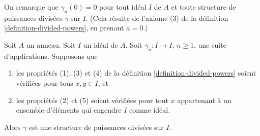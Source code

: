 \noindent
On remarque que $\gamma_n\left(0\right) = 0$ pour tout idéal $I$ de
$A$ et toute structure de puissances divisées $\gamma$ sur $I$. (Cela résulte
de l'axiome (3) de la définition \ref{definition-divided-powers},
en prenant $a=0$.)

\begin{lemma}
\label{lemma-check-on-generators}
Soit $A$ un anneau. Soit $I$ un idéal de $A$. Soit $\gamma_n : I \to I$,
$n \geq 1$, une suite d'applications. Supposons que
\begin{enumerate}
\item[(a)] les propriétés (1), (3) et (4) de la définition
\ref{definition-divided-powers} soient vérifiées pour tous $x, y \in I$, et
\item[(b)] les propriétés (2) et (5) soient vérifiées pour tout $x$ appartenant
à un ensemble d'éléments qui engendre $I$ comme idéal.
\end{enumerate}
Alors $\gamma$ est une structure de puissances divisées sur $I$.
\end{lemma}

